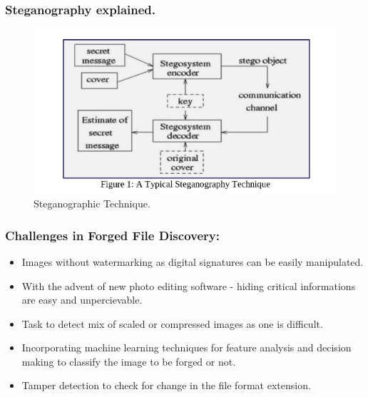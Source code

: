\documentclass{beamer} %
\theoremstyle{definition} %
\begin{document}
\begin{frame}
\frametitle{Steganography explained.}
\begin{figure}
	\includegraphics[scale=0.40]{stegTech.png}
	\caption{Steganographic Technique.}
	
\end{figure}
\end{frame}
\begin{frame}
\frametitle{Challenges in Forged File Discovery:}
 \begin{itemize}
	\item{Images without watermarking as digital signatures can be easily manipulated.}
\end{itemize}
\begin{itemize}
	\item{With the advent of new photo editing software - hiding critical informations are easy and unpercievable. }
\end{itemize}
\begin{itemize}
	\item {Task to detect mix of scaled or compressed images as one is difficult.}
\end{itemize}
\begin{itemize}
	\item{Incorporating machine learning techniques for feature analysis and decision making  to classify the image to be forged or not.  
	}
   \item{Tamper detection to check for change in the file format extension.}
\end{itemize}
\end{frame}
\end{document}
